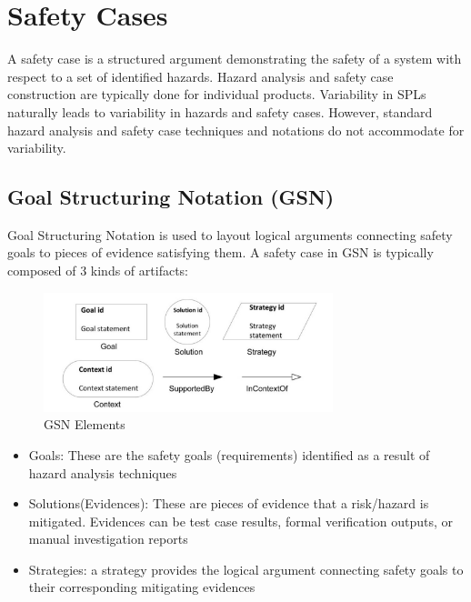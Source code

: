 \documentclass[11pt]{article}
\begin{document}
\section{Safety Cases}

A safety case is a structured argument demonstrating the safety of a system with respect to a set of identified hazards. Hazard analysis and safety case construction are typically done for individual products. Variability in SPLs naturally leads to variability in hazards and safety cases. However, standard hazard analysis and safety case techniques and notations do not accommodate for variability. 
 
\subsection{Goal Structuring Notation (GSN)}

Goal Structuring Notation is used to layout logical arguments connecting safety goals to pieces of evidence satisfying them. A safety case in GSN is typically composed of 3 kinds of artifacts:

\begin{figure}
  \centering
  \includegraphics[width=0.75\textwidth]{gsn}
  \caption{GSN Elements}
\end{figure}

\begin{itemize}
\item Goals: These are the safety goals (requirements) identified as a result of hazard analysis techniques
\item Solutions(Evidences): These are pieces of evidence that a risk/hazard is mitigated. Evidences can be test case results, formal verification outputs, or manual investigation reports
\item Strategies: a strategy provides the logical argument connecting safety goals to their corresponding mitigating evidences
\end{itemize}
\end{document}
